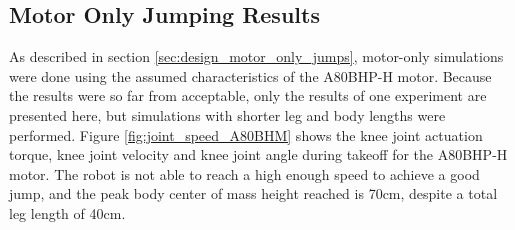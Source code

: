 \subsection{Motor Only Jumping Results}
\label{sec:results_motor_only_jumps}

As described in section \ref{sec:design_motor_only_jumps}, motor-only simulations were done using the assumed characteristics of the A80BHP-H motor. Because the results were so far from acceptable, only the results of one experiment are presented here, but simulations with shorter leg and body lengths were performed. Figure \ref{fig:joint_speed_A80BHM} shows the knee joint actuation torque, knee joint velocity and knee joint angle during takeoff for the A80BHP-H motor. The robot is not able to reach a high enough speed to achieve a good jump, and the peak body center of mass height reached is 70cm, despite a total leg length of 40cm.



